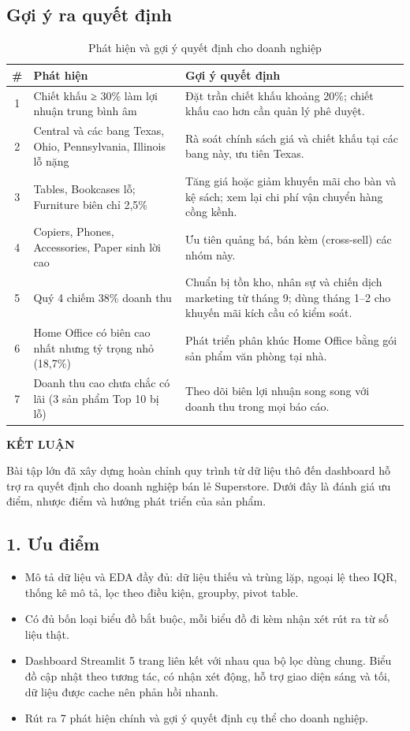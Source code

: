 \documentclass[12pt,a4paper]{article}
\newcommand{\TieuDeLon}[1]{\clearpage\phantomsection\addcontentsline{toc}{section}{#1}%
  \begin{center}{\fontsize{14}{18}\selectfont\bfseries #1}\end{center}\vspace{4pt}}
\begin{document}
\subsection{Gợi ý ra quyết định}
\begin{table}[H]
\centering
\caption{Phát hiện và gợi ý quyết định cho doanh nghiệp}\label{tab:dexuat}
\small
\begin{tabularx}{\linewidth}{@{}c Y Y@{}}
\toprule
\textbf{\#} & \textbf{Phát hiện} & \textbf{Gợi ý quyết định} \\
 & Chiết khấu ≥ 30\% làm lợi nhuận trung bình âm
  & Đặt trần chiết khấu khoảng 20\%; chiết khấu cao hơn cần quản lý phê duyệt. \\
2 & Central và các bang Texas, Ohio, Pennsylvania, Illinois lỗ nặng
  & Rà soát chính sách giá và chiết khấu tại các bang này, ưu tiên Texas. \\
3 & Tables, Bookcases lỗ; Furniture biên chỉ 2,5\%
  & Tăng giá hoặc giảm khuyến mãi cho bàn và kệ sách; xem lại chi phí vận chuyển hàng cồng kềnh. \\
4 & Copiers, Phones, Accessories, Paper sinh lời cao
  & Ưu tiên quảng bá, bán kèm (cross-sell) các nhóm này. \\
5 & Quý 4 chiếm 38\% doanh thu
  & Chuẩn bị tồn kho, nhân sự và chiến dịch marketing từ tháng 9; dùng tháng 1–2 cho khuyến mãi kích cầu có kiểm soát. \\
6 & Home Office có biên cao nhất nhưng tỷ trọng nhỏ (18,7\%)
  & Phát triển phân khúc Home Office bằng gói sản phẩm văn phòng tại nhà. \\
7 & Doanh thu cao chưa chắc có lãi (3 sản phẩm Top 10 bị lỗ)
  & Theo dõi biên lợi nhuận song song với doanh thu trong mọi báo cáo. \\
\bottomrule
\end{tabularx}
\end{table}


\TieuDeLon{KẾT LUẬN}
Bài tập lớn đã xây dựng hoàn chỉnh quy trình từ dữ liệu thô đến dashboard hỗ trợ ra quyết định cho doanh nghiệp
bán lẻ Superstore. Dưới đây là đánh giá ưu điểm, nhược điểm và hướng phát triển của sản phẩm.

\subsection*{1. Ưu điểm}
\begin{itemize}
  \item Mô tả dữ liệu và EDA đầy đủ: dữ liệu thiếu và trùng lặp, ngoại lệ theo IQR, thống kê mô tả,
        lọc theo điều kiện, groupby, pivot table.
  \item Có đủ bốn loại biểu đồ bắt buộc, mỗi biểu đồ đi kèm nhận xét rút ra từ số liệu thật.
  \item Dashboard Streamlit 5 trang liên kết với nhau qua bộ lọc dùng chung. Biểu đồ cập nhật theo tương tác,
        có nhận xét động, hỗ trợ giao diện sáng và tối, dữ liệu được cache nên phản hồi nhanh.
  \item Rút ra 7 phát hiện chính và gợi ý quyết định cụ thể cho doanh nghiệp.
\end{itemize}
\end{document}
